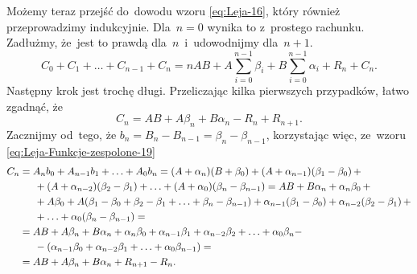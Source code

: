 \documentclass[a4paper,11pt]{article}
\begin{document}
Możemy teraz przejść do~dowodu wzoru \eqref{eq:Leja-16}, który również
przeprowadzimy indukcyjnie. Dla~$n = 0$ wynika to z~prostego rachunku.
Zadłużmy, że~jest to prawdą dla~$n$~i~udowodnijmy dla~$n + 1$.
\begin{equation}
  \label{eq:Leja-Funkcje-zespolone-24}
  C_{ 0 } + C_{ 1 } + \ldots + C_{ n - 1 } + C_{ n } =
  n AB + A \sum_{ i = 0 }^{ n - 1 } \beta_{ i } + B \sum_{ i = 0 }^{ n - 1 }
  \alpha_{ i } + R_{ n } + C_{ n }.
\end{equation}
Następny krok jest trochę długi. Przeliczając kilka pierwszych
przypadków, łatwo zgadnąć, że
\begin{equation}
  \label{eq:Leja-Funkcje-zespolone-25}
  C_{ n } = AB + A \beta_{ n } + B \alpha_{ n } - R_{ n } + R_{ n + 1 }.
\end{equation}
Zacznijmy od~tego, że
$b_{ n } = B_{ n } - B_{ n - 1 } = \beta_{ n } - \beta_{ n - 1 }$,
korzystając więc, ze~wzoru \eqref{eq:Leja-Funkcje-zespolone-19}
\begin{equation}
  \label{eq:Leja-Funkcje-zespolone-26}
  \begin{split}
    C_{ n }
    &= A_{ n } b_{ 0 } + A_{ n - 1 } b_{ 1 } + \ldots + A_{ 0 }
      b_{ n } = ( A + \alpha_{ n } ) ( B + \beta_{ 0 } ) + ( A + \alpha_{ n - 1 } )
      ( \beta_{ 1 } - \beta_{ 0 } ) \, + \\
    &\hspace{1.5em} + ( A + \alpha_{ n - 2 } )( \beta_{ 2 } - \beta_{ 1 } ) + \ldots
      + ( A + \alpha_{ 0 } ) ( \beta_{ n } - \beta_{ n - 1 } ) =
      AB + B \alpha_{ n } + \alpha_{ n } \beta_{ 0 } \, + \\
    &\hspace{1.5em} + A \beta_{ 0 } + A ( \beta_{ 1 } - \beta_{ 0 } + \beta_{ 2 }
      - \beta_{ 1 } + \ldots + \beta_{ n } - \beta_{ n - 1 } ) + \alpha_{ n - 1 } ( \beta_{ 1 } - \beta_{ 0 } )
      + \alpha_{ n - 2 } ( \beta_{ 2 } - \beta_{ 1 } ) \, + \\
    &\hspace{1.5em} + \ldots + \alpha_{ 0 } ( \beta_{ n } - \beta_{ n - 1 } ) = \\
    &=
      AB + A \beta_{ n } + B \alpha_{ n } + \alpha_{ n } \beta_{ 0 } + \alpha_{ n - 1 } \beta_{ 1 }
      + \alpha_{ n - 2 } \beta_{ 2 } + \ldots + \alpha_{ 0 } \beta_{ n } - \\
    &\hspace{1.5em} - ( \alpha_{ n - 1 } \beta_{ 0 } + \alpha_{ n - 2 } \beta_{ 1 }
      + \ldots + \alpha_{ 0 } \beta_{ n - 1 } ) = \\
    &= AB + A \beta_{ n } + B \alpha_{ n } + R_{ n + 1 } - R_{ n }.
  \end{split}
\end{equation}
\end{document}
